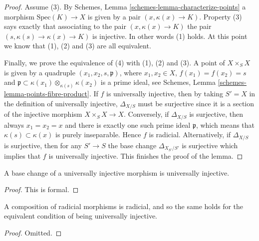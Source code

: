 \begin{proof}
\medskip\noindent
Assume (3). By
Schemes, Lemma \ref{schemes-lemma-characterize-points}
a morphism $\text{Spec}(K) \to X$ is given by a pair $(x, \kappa(x) \to K)$.
Property (3) says exactly that associating to the pair
$(x, \kappa(x) \to K)$ the pair $(s, \kappa(s) \to \kappa(x) \to K)$
is injective. In other words (1) holds. At this point we know that
(1), (2) and (3) are all equivalent.

\medskip\noindent
Finally, we prove the equivalence of (4) with (1), (2) and (3).
A point of $X \times_S X$ is given by a quadruple
$(x_1, x_2, s, \mathfrak p)$, where $x_1, x_2 \in X$,
$f(x_1) = f(x_2) = s$ and
$\mathfrak p \subset \kappa(x_1) \otimes_{\kappa(s)} \kappa(x_2)$
is a prime ideal, see
Schemes, Lemma \ref{schemes-lemma-points-fibre-product}.
If $f$ is universally injective, then 
by taking $S'=X$ in the definition of universally injective,
$\Delta_{X/S}$ must be surjective since it is a section of
the injective morphism
$X \times_S X  \longrightarrow X$.
Conversely, if
$\Delta_{X/S}$ is surjective, then always $x_1 = x_2 = x$ and there
is exactly one such prime ideal $\mathfrak p$, which means that
$\kappa(s) \subset \kappa(x)$ is purely inseparable.
Hence $f$ is radicial.
Alternatively, if $\Delta_{X/S}$ is surjective,
then for any $S' \to S$ the base
change $\Delta_{X_{S'}/S'}$ is surjective which implies that $f$
is universally injective. This finishes the proof of the lemma.
\end{proof}

\begin{lemma}
\label{lemma-base-change-universally-injective}
A base change of a universally injective morphism is universally injective.
\end{lemma}

\begin{proof}
This is formal.
\end{proof}

\begin{lemma}
\label{lemma-composition-universally-injective}
A composition of radicial morphisms is radicial, and so the same holds
for the equivalent condition of being universally injective.
\end{lemma}

\begin{proof}
Omitted.
\end{proof}









